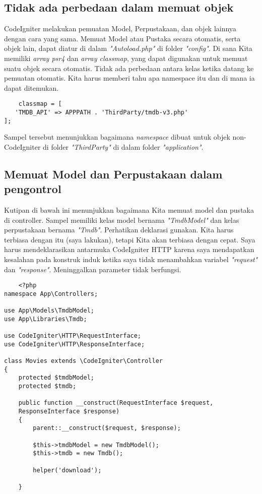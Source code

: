 \subsection{Tidak ada perbedaan dalam memuat objek}
CodeIgniter melakukan pemuatan Model, Perpustakaan, dan objek lainnya dengan cara yang sama. Memuat Model atau Pustaka secara otomatis, serta objek lain, dapat diatur di dalam \textit{"Autoload.php"} di folder  \textit{"config"}. Di sana Kita memiliki \textit{array psr4} dan \textit{array classmap}, yang dapat digunakan untuk memuat suatu objek secara otomatis. Tidak ada perbedaan antara kelas ketika datang ke pemuatan otomatis. Kita harus memberi tahu apa namespace itu dan di mana ia dapat ditemukan.

\begin{verbatim}
    classmap = [
   'TMDB_API' => APPPATH . 'ThirdParty/tmdb-v3.php'
];
\end{verbatim}

Sampel tersebut menunjukkan bagaimana \textit{namespace} dibuat untuk objek non-CodeIgniter di folder \textit{"ThirdParty"}  di dalam folder \textit{"application"}.

\subsection{Memuat Model dan Perpustakaan dalam pengontrol}
Kutipan di bawah ini  menunjukkan bagaimana Kita memuat model dan pustaka di controller.
Sampel memiliki kelas model bernama \textit{"TmdbModel"} dan kelas perpustakaan bernama \textit{"Tmdb"}. Perhatikan deklarasi gunakan. Kita harus terbiasa dengan itu (saya lakukan), tetapi Kita akan terbiasa dengan cepat. Saya harus mendeklarasikan antarmuka CodeIgniter HTTP karena saya mendapatkan kesalahan pada konstruk induk ketika saya tidak menambahkan variabel \textit{"request"}  dan \textit{"response"}. Meninggalkan parameter tidak berfungsi.

\begin{verbatim}
    <?php
namespace App\Controllers;
 
use App\Models\TmdbModel;
use App\Libraries\Tmdb;
 
use CodeIgniter\HTTP\RequestInterface;
use CodeIgniter\HTTP\ResponseInterface;
 
class Movies extends \CodeIgniter\Controller
{
    protected $tmdbModel;
    protected $tmdb;
 
    public function __construct(RequestInterface $request,
    ResponseInterface $response)
    {
        parent::__construct($request, $response);
 
        $this->tmdbModel = new TmdbModel();
        $this->tmdb = new Tmdb();
 
        helper('download');
 
    }
\end{verbatim}

